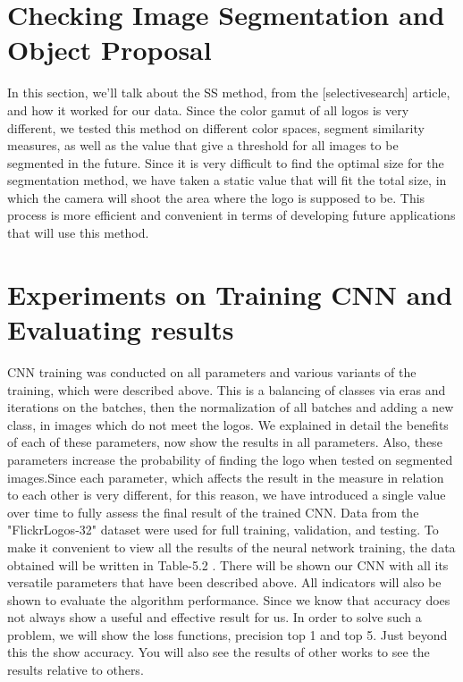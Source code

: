 \section{Checking Image Segmentation and Object Proposal}\label{sec:5.3}
\par In this section, we'll talk about the SS method, from the [selectivesearch] article, and how it worked for our data. Since the color gamut of all logos is very different, we tested this method on different color spaces, segment similarity measures, as well as the value that give a threshold for all images to be segmented in the future. Since it is very difficult to find the optimal size for the segmentation method, we have taken a static value that will fit the total size, in which the camera will shoot the area where the logo is supposed to be. This process is more efficient and convenient in terms of developing future applications that will use this method.

\vspace{-0.3cm}

\section{Experiments on Training CNN and Evaluating results}\label{sec:5.4}
\par CNN training was conducted on all parameters and various variants of the training, which were described above. This is a balancing of classes via eras and iterations on the batches, then the normalization of all batches and adding a new class, in images which do not meet the logos. We explained in detail the benefits of each of these parameters, now show the results in all parameters. Also, these parameters increase the probability of finding the logo when tested on segmented images.Since each parameter, which affects the result in the measure in relation to each other is very different, for this reason, we have introduced a single value over time to fully assess the final result of the trained CNN. Data from the "FlickrLogos-32" dataset were used for full training, validation, and testing. To make it convenient to view all the results of the neural network training, the data obtained will be written in Table-5.2 . There will be shown our CNN with all its versatile parameters that have been described above. All indicators will also be shown to evaluate the algorithm performance. Since we know that accuracy does not always show a useful and effective result for us. In order to solve such a problem, we will show the loss functions, precision top 1 and top 5. Just beyond this the show accuracy. You will also see the results of other works to see the results relative to others.

